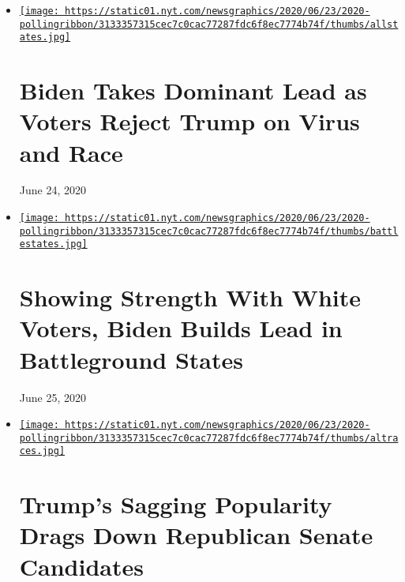 \begin{itemize}
\item
  \href{https://www.nytimes.com/2020/06/24/us/politics/trump-biden-poll-nyt-upshot-siena-college.html}{\texttt{[image: https://static01.nyt.com/newsgraphics/2020/06/23/2020-pollingribbon/3133357315cec7c0cac77287fdc6f8ec7774b74f/thumbs/allstates.jpg]}}

  \href{https://www.nytimes.com/2020/06/24/us/politics/trump-biden-poll-nyt-upshot-siena-college.html}{}

  \hypertarget{biden-takes-dominant-lead-as-voters-reject-trump-on-virus-and-race}{%
  \section{Biden Takes Dominant Lead as Voters Reject Trump on Virus and
  Race}\label{biden-takes-dominant-lead-as-voters-reject-trump-on-virus-and-race}}

  June 24, 2020
\item
  \href{https://www.nytimes.com/2020/06/25/upshot/poll-2020-biden-battlegrounds.html}{\texttt{[image: https://static01.nyt.com/newsgraphics/2020/06/23/2020-pollingribbon/3133357315cec7c0cac77287fdc6f8ec7774b74f/thumbs/battlestates.jpg]}}

  \href{https://www.nytimes.com/2020/06/25/upshot/poll-2020-biden-battlegrounds.html}{}

  \hypertarget{showing-strength-with-white-voters-biden-builds-lead-in-battleground-states}{%
  \section{Showing Strength With White Voters, Biden Builds Lead in
  Battleground
  States}\label{showing-strength-with-white-voters-biden-builds-lead-in-battleground-states}}

  June 25, 2020
\item
  \href{https://www.nytimes.com/2020/06/25/us/politics/trump-senate-republicans-poll.html}{\texttt{[image: https://static01.nyt.com/newsgraphics/2020/06/23/2020-pollingribbon/3133357315cec7c0cac77287fdc6f8ec7774b74f/thumbs/altraces.jpg]}}

  \href{https://www.nytimes.com/2020/06/25/us/politics/trump-senate-republicans-poll.html}{}

  \hypertarget{trumps-sagging-popularity-drags-down-republican-senate-candidates}{%
  \section{Trump's Sagging Popularity Drags Down Republican Senate
  Candidates}\label{trumps-sagging-popularity-drags-down-republican-senate-candidates}}


\end{itemize}
